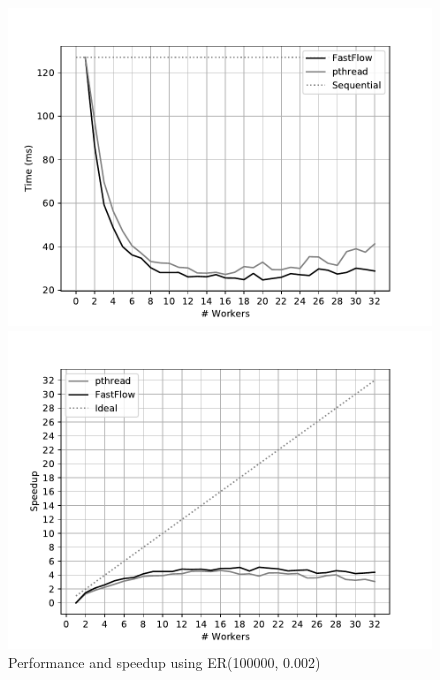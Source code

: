 \begin{figure}[h]
    \centering
    \begin{minipage}{0.48\textwidth}
        \includegraphics[width=\textwidth]{plots/fastflow_performance_002_time.pdf}
    \end{minipage}
    \begin{minipage}{0.48\textwidth}
        \includegraphics[width=\textwidth]{plots/fastflow_speedup_002_time.pdf}
    \end{minipage}
    \begin{minipage}{1\textwidth}
    \caption{Performance and speedup using ER(100000, 0.002)}
    \label{fig:perf_002}
\end{minipage}
\end{figure}
